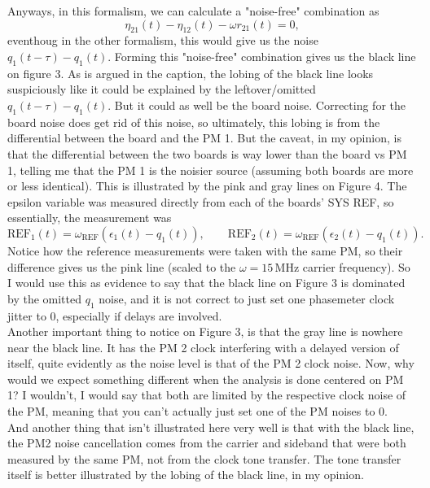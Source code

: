 \documentclass[11pt]{article}
\begin{document}
Anyways, in this formalism, we can calculate a "noise-free" combination as
\begin{equation*}
    \eta_{21}(t) - \eta_{12}(t) -\omega r_{21}(t)=0,
\end{equation*}
eventhoug in the other formalism, this would give us the noise $q_1(t-\tau)-q_1(t)$. Forming this "noise-free" combination gives us the black line on figure 3. As is argued in the caption, the lobing of the black line looks suspiciously like it could be explained by the leftover/omitted $q_1(t-\tau)-q_1(t)$. But it could as well be the board noise. Correcting for the board noise does get rid of this noise, so ultimately, this lobing is from the differential between the board and the PM 1. But the caveat, in my opinion, is that the differential between the two boards is way lower than the board vs PM 1, telling me that the PM 1 is the noisier source (assuming both boards are more or less identical). This is illustrated by the pink and gray lines on Figure 4. The epsilon variable was measured directly from each of the boards' SYS REF, so essentially, the measurement was
\begin{equation*}
    \text{REF}_1(t)=\omega_{\text{REF}}(\epsilon_1(t)-q_1(t)), \qquad \text{REF}_2(t)=\omega_{\text{REF}}(\epsilon_2(t)-q_1(t)).
\end{equation*}
Notice how the reference measurements were taken with the same PM, so their difference gives us the pink line (scaled to the $\omega = 15\, \text{MHz}$ carrier frequency). So I would use this as evidence to say that the black line on Figure 3 is dominated by the omitted $q_1$ noise, and it is not correct to just set one phasemeter clock jitter to 0, especially if delays are involved.\\
Another important thing to notice on Figure 3, is that the gray line is nowhere near the black line. It has the PM 2 clock interfering with a delayed version of itself, quite evidently as the noise level is that of the PM 2 clock noise. Now, why would we expect something different when the analysis is done centered on PM 1? I wouldn't, I would say that both are limited by the respective clock noise of the PM, meaning that you can't actually just set one of the PM noises to 0.\\
And another thing that isn't illustrated here very well is that with the black line, the PM2 noise cancellation comes from the carrier and sideband that were both measured by the same PM, not from the clock tone transfer. The tone transfer itself is better illustrated by the lobing of the black line, in my opinion.
\end{document}
